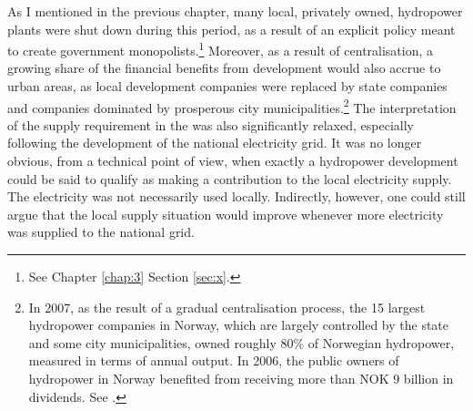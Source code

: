 As I mentioned in the previous chapter, many local, privately owned, hydropower plants were shut down during this period, as a result of an explicit policy meant to create government monopolists.\footnote{See Chapter \ref{chap:3} Section \ref{sec:x}.} Moreover, as a result of centralisation, a growing share of the financial benefits from development would also accrue to urban areas, as local development companies were replaced by state companies and companies dominated by prosperous city municipalities.\footnote{In 2007, as the result of a gradual centralisation process, the 15 largest hydropower companies in Norway, which are largely controlled by the state and some city municipalities, owned roughly 80\% of Norwegian hydropower, measured in terms of annual output. In 2006, the public owners of hydropower in Norway benefited from receiving more than NOK 9 billion in dividends. See \cite[28]{otprp61}.} The interpretation of the supply requirement in the \cite{wra40} was also significantly relaxed, especially following the development of the national electricity grid. It was no longer obvious, from a technical point of view, when exactly a hydropower development could be said to qualify as making a contribution to the local electricity supply. The electricity was not necessarily used locally. Indirectly, however, one could still argue that the local supply situation would improve whenever more electricity was supplied to the national grid.


